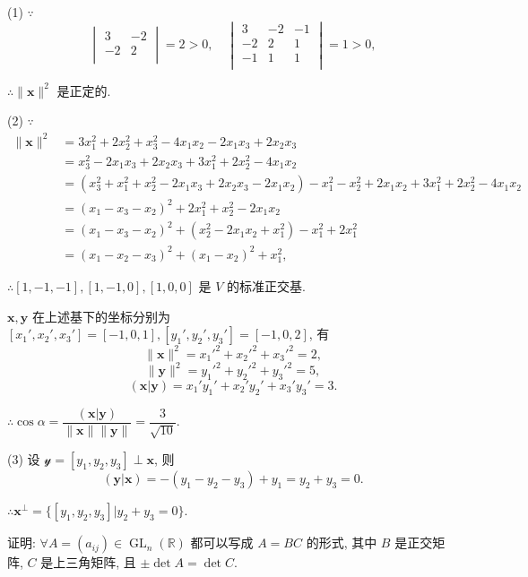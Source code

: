 \documentclass{ctexart}
\begin{document}
\begin{solution}
    (1) $\because$
    \[\begin{vmatrix}
        3 & -2 \\
        -2 & 2 \\
    \end{vmatrix}=2>0,\quad\begin{vmatrix}
        3 & -2 & -1 \\
        -2 & 2 & 1 \\
        -1 & 1 & 1 \\
    \end{vmatrix}=1>0,\]

    $\therefore\|\boldsymbol{x}\|^2$ 是正定的.

    (2) $\because$
    \begin{align*}
        \|\boldsymbol{x}\|^2 & =3x_1^2+2x_2^2+x_3^2-4x_1x_2-2x_1x_3+2x_2x_3 \\
        & =x_3^2-2x_1x_3+2x_2x_3+3x_1^2+2x_2^2-4x_1x_2 \\
        & =(x_3^2+x_1^2+x_2^2-2x_1x_3+2x_2x_3-2x_1x_2)-x_1^2-x_2^2+2x_1x_2+3x_1^2+2x_2^2-4x_1x_2 \\
        & =(x_1-x_3-x_2)^2+2x_1^2+x_2^2-2x_1x_2 \\
        & =(x_1-x_3-x_2)^2+(x_2^2-2x_1x_2+x_1^2)-x_1^2+2x_1^2 \\
        & =(x_1-x_2-x_3)^2+(x_1-x_2)^2+x_1^2,
    \end{align*}

    $\therefore[1,-1,-1],[1,-1,0],[1,0,0]$ 是 $V$ 的标准正交基.
    
    $\boldsymbol{x},\boldsymbol{y}$ 在上述基下的坐标分别为 $[x_1',x_2',x_3']=[-1,0,1],[y_1',y_2',y_3']=[-1,0,2]$, 有
    \[\|\boldsymbol{x}\|^2=x_1'^2+x_2'^2+x_3'^2=2,\]
    \[\|\boldsymbol{y}\|^2=y_1'^2+y_2'^2+y_3'^2=5,\]
    \[(\boldsymbol{x}|\boldsymbol{y})=x_1'y_1'+x_2'y_2'+x_3'y_3'=3.\]

    $\therefore\cos\alpha=\dfrac{(\boldsymbol{x}|\boldsymbol{y})}{\|\boldsymbol{x}\|\|\boldsymbol{y}\|}=\dfrac{3}{\sqrt{10}}$.

    (3) 设 $\mathcal{y}=[y_1,y_2,y_3]\perp\boldsymbol{x}$, 则
    \[(\boldsymbol{y}|\boldsymbol{x})=-(y_1-y_2-y_3)+y_1=y_2+y_3=0.\]

    $\therefore\boldsymbol{x}^\perp=\{[y_1,y_2,y_3]|y_2+y_3=0\}$.
\end{solution}
\begin{exercise}[1.3]\label{ex1.3}
    证明: $\forall A=(a_{ij})\in\operatorname{GL}_n(\mathbb{R})$ 都可以写成 $A=BC$ 的形式, 其中 $B$ 是正交矩阵, $C$ 是上三角矩阵, 且 $\pm\det A=\det C$.
\end{exercise}
\end{document}
